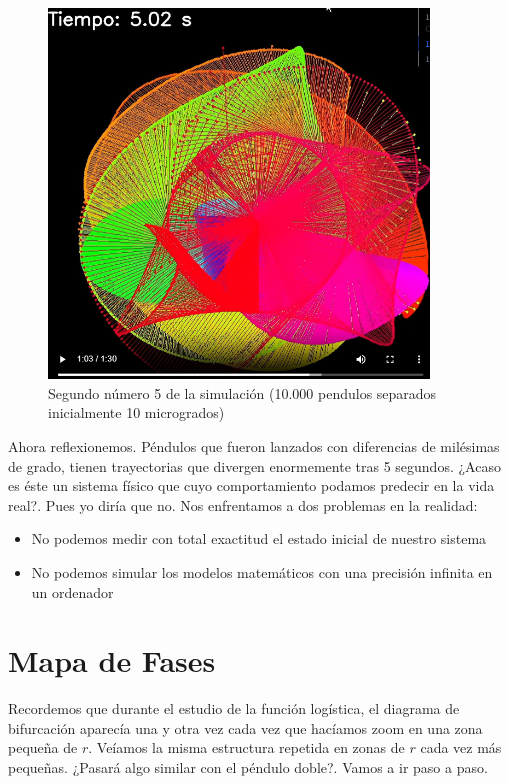 \documentclass[
  10pt,
  a4paper,
  DIV=11,
  numbers=noendperiod,
  open=any]{scrreprt}
\providecommand{\tightlist}{%
  \setlength{\itemsep}{0pt}\setlength{\parskip}{0pt}}
\numberwithin{equation}{chapter}
\numberwithin{equation}{section}
\renewcommand{\[}{\begin{equation}}
\renewcommand{\]}{\end{equation}}
\begin{document}
\begin{figure}[h]
  \centering
  \includegraphics[width=0.9\textwidth]{02-pendulo-doble/abanico.png}
  \caption{Segundo número 5 de la simulación (10.000 pendulos separados inicialmente 10 microgrados)}
\end{figure}

Ahora reflexionemos. Péndulos que fueron lanzados con diferencias de
milésimas de grado, tienen trayectorias que divergen enormemente tras 5
segundos. ¿Acaso es éste un sistema físico que cuyo comportamiento
podamos predecir en la vida real?. Pues yo diría que no. Nos enfrentamos a dos problemas en la realidad:

\begin{itemize}
\tightlist
\item
  No podemos medir con total exactitud el estado inicial de nuestro
  sistema
\item
  No podemos simular los modelos matemáticos con una precisión infinita
  en un ordenador
\end{itemize}

\chapter{Mapa de Fases}\label{mapa-de-fases}

Recordemos que durante el estudio de la función logística, el diagrama
de bifurcación aparecía una y otra vez cada vez que hacíamos zoom en una
zona pequeña de \(r\). Veíamos la misma estructura repetida en zonas de
\(r\) cada vez más pequeñas. ¿Pasará algo similar con el péndulo doble?.
Vamos a ir paso a paso.
\end{document}
